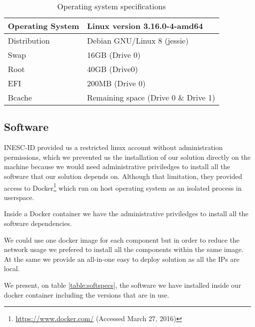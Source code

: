 	\begin{table}[!htb]
\centering
\caption{Operating system specifications}
\label{table:osspecs}
\begin{tabular}{|l|l|}
\hline
Operating System & Linux version 3.16.0-4-amd64 \\ \hline
Distribution & Debian GNU/Linux 8 (jessie)\footnotemark \\ \hline
Swap & 16GB (Drive 0)\\ \hline
Root & 40GB (Drive0)\\ \hline
EFI & 200MB (Drive 0)\\ \hline
Bcache & Remaining space (Drive 0 \& Drive 1) \\ \hline
\end{tabular}
\end{table}


\subsection{Software}
	INESC-ID provided us a restricted linux account without administration permissions, which we prevented us the installation of our solution directly on the machine because we would need administrative priviledges to install all the software that our solution depends on. Although that limitation, they provided access to Docker\footnote{\url{https://www.docker.com/} (Accessed March 27, 2016)} which run on host operating system as an isolated process in userspace.

	Inside a Docker container we have the administrative priviledges to install all the software dependencies.

	We could use one docker image for each component but in order to reduce the network usage we prefered to install all the components within the same image. At the same we provide an all-in-one easy to deploy solution as all the \ac{IP}s are local.

	We present, on table \ref{table:softspecs}, the software we have installed inside our docker container including the versions that are in use.

